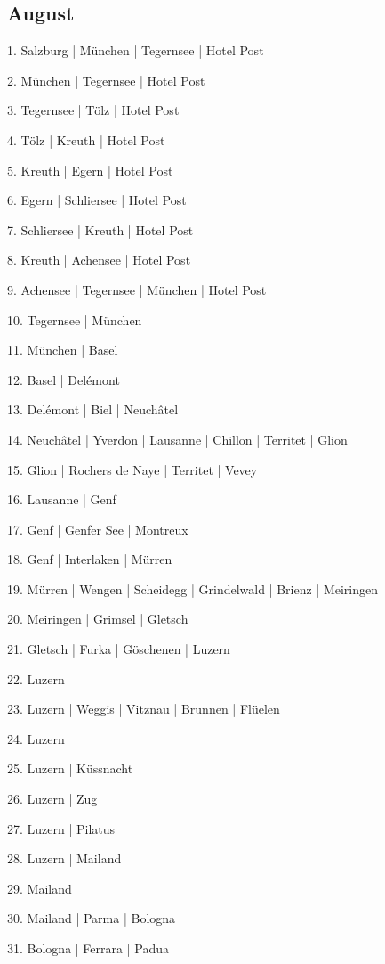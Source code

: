 \documentclass[twoside=false,titlepage=false,open=any, parskip=never, fontsize=10pt, headings=small, chapterprefix=false, appendixprefix=false, DIV=15]{scrbook}
\begin{document}
\begin{multicols}{3}
            \section*{August}
            1. Salzburg | München | Tegernsee | Hotel Post\par
            2. München | Tegernsee | Hotel Post\par
            3. Tegernsee | Tölz | Hotel Post\par
            4. Tölz | Kreuth | Hotel Post\par
            5. Kreuth | Egern | Hotel Post\par
            6. Egern | Schliersee | Hotel Post\par
            7. Schliersee | Kreuth | Hotel Post\par
            8. Kreuth | Achensee | Hotel Post\par
            9. Achensee | Tegernsee | München | Hotel Post\par
            10. Tegernsee | München\par
            11. München | Basel\par
            12. Basel | Delémont\par
            13. Delémont | Biel | Neuchâtel\par
            14. Neuchâtel | Yverdon | Lausanne | Chillon | Territet | Glion\par
            15. Glion | Rochers de Naye | Territet | Vevey\par
            16. Lausanne | Genf\par
            17. Genf | Genfer See | Montreux\par
            18. Genf | Interlaken | Mürren\par
            19. Mürren | Wengen | Scheidegg | Grindelwald | Brienz | Meiringen\par
            20. Meiringen | Grimsel | Gletsch\par
            21. Gletsch | Furka | Göschenen | Luzern\par
            22. Luzern\par
            23. Luzern | Weggis | Vitznau | Brunnen | Flüelen\par
            24. Luzern\par
            25. Luzern | Küssnacht\par
            26. Luzern | Zug\par
            27. Luzern | Pilatus\par
            28. Luzern | Mailand\par
            29. Mailand\par
            30. Mailand | Parma | Bologna\par
            31. Bologna | Ferrara | Padua\par

\end{multicols}
\end{document}
